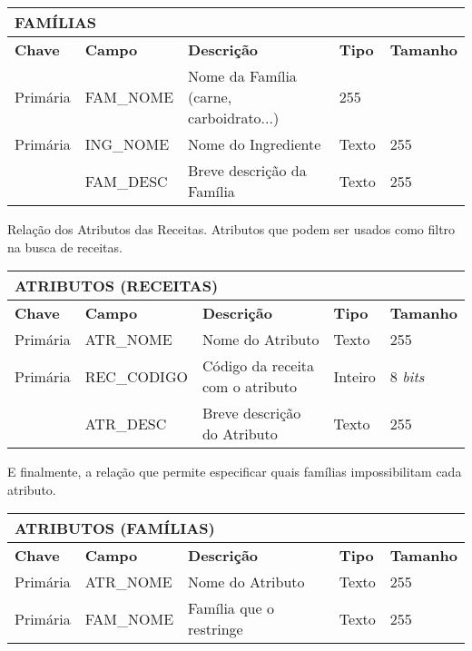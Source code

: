 \documentclass[a4paper]{article}
\begin{document}
\begin{center}
\begin{tabular}{ l | l || l | l l }
  \multicolumn{5}{l}{\textbf{FAMÍLIAS}} \\
  \hline
  \textbf{Chave} & \textbf{Campo} & \textbf{Descrição} & \textbf{Tipo} & \textbf{Tamanho} \\
  \cline{1-5}
  Primária & FAM\_NOME & Nome da Família (carne, carboidrato...) & 255 \\
  Primária & ING\_NOME & Nome do Ingrediente & Texto & 255 \\
  & FAM\_DESC & Breve descrição da Família & Texto & 255
\end{tabular}
\end{center}

Relação dos Atributos das Receitas. Atributos que podem ser usados como filtro na busca de receitas.

\begin{center}
\begin{tabular}{ l | l || l | l l }
  \multicolumn{5}{l}{\textbf{ATRIBUTOS (RECEITAS)}} \\
  \hline
  \textbf{Chave} & \textbf{Campo} & \textbf{Descrição} & \textbf{Tipo} & \textbf{Tamanho} \\
  \cline{1-5}
  Primária & ATR\_NOME & Nome do Atributo & Texto & 255 \\
  Primária & REC\_CODIGO & Código da receita com o atributo & Inteiro & 8 \emph{bits} \\
   & ATR\_DESC & Breve descrição do Atributo & Texto & 255
\end{tabular}
\end{center}

E finalmente, a relação que permite especificar quais famílias impossibilitam cada atributo.

\begin{center}
\begin{tabular}{ l | l || l | l l }
  \multicolumn{5}{l}{\textbf{ATRIBUTOS (FAMÍLIAS)}} \\
  \hline
  \textbf{Chave} & \textbf{Campo} & \textbf{Descrição} & \textbf{Tipo} & \textbf{Tamanho} \\
  \cline{1-5}
  Primária & ATR\_NOME & Nome do Atributo& Texto & 255 \\
  Primária & FAM\_NOME & Família que o restringe & Texto & 255
\end{tabular}
\end{center}
\end{document}
